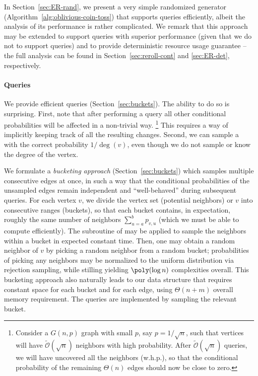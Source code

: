 In Section~\ref{sec:ER-rand}, we present a very simple randomized generator
(Algorithm~\ref{alg:oblivious-coin-toss}) that supports 
queries efficiently, albeit the analysis of its performance is rather complicated.
We remark that this approach may be extended to support  queries with superior performance (given that we do not to support  queries) and to provide deterministic resource usage guarantee -- the full analysis can be found in Section~\ref{sec:reroll-cont} and \ref{sec:ER-det}, respectively.

\paragraph{ Queries}
\label{par:random_neighbor_queries}
We provide efficient  queries (Section~\ref{sec:buckets}).
The ability to do so is surprising.  First, note that after performing a  query
all other conditional probabilities will be affected in a non-trivial way.
\footnote{Consider a $G(n,p)$ graph with small $p$, say $p = 1/\sqrt n$,
such that vertices will have $\tilde{\mathcal{O}}(\sqrt n)$ neighbors with high probability.
After $\tilde{\mathcal{O}}(\sqrt n)$  queries,
we will have uncovered all the neighbors (w.h.p.),
so that the conditional probability of the remaining
$\Theta(n)$ edges should now be close to zero.}
This requires a way of implicitly keeping track of all the resulting changes.
Second, we can sample a  with the correct probability $1/\deg(v)$,
even though we do not sample or know the degree of the vertex.

We formulate a {\em bucketing approach} (Section~\ref{sec:buckets})
which samples multiple consecutive edges at once, in such a way
that the conditional probabilities of the unsampled edges
remain independent and ``well-behaved'' during subsequent queries.
For each vertex $v$, we divide the vertex set (potential neighbors) or $v$ into consecutive ranges (buckets),
so that each bucket contains, in expectation, roughly the same number of neighbors
$\sum^{b}_{u=a} p_{v,u}$ (which we must be able to compute efficiently).
The subroutine of  may be applied to sample the neighbors within a bucket in expected constant time.
Then, one may obtain a random neighbor of $v$ by picking a random neighbor from a random bucket;
probabilities of picking any neighbors may be normalized to the uniform distribution via rejection sampling,
while stilling yielding $\poly(\log n)$ complexities overall.
This bucketing approach also naturally leads to our data structure that requires
constant space for each bucket and for each edge, using $\Theta(n+m)$ overall memory requirement.
The  queries are implemented by sampling the relevant bucket.

